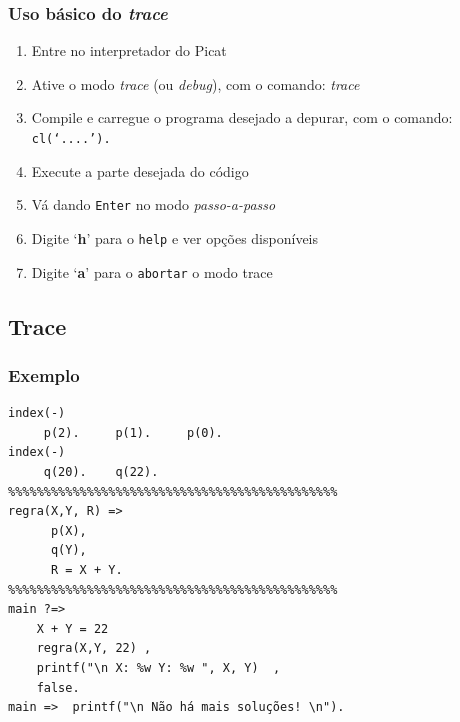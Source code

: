 \begin{frame}[fragile]

\frametitle{Uso básico do \textit{trace}}

\begin{enumerate}
  \item Entre no interpretador do Picat
  
    \item Ative o modo \textit{trace} (ou \textit{debug}), com o comando: \textit{trace}
    
    \item Compile e carregue o programa desejado 
    a depurar, com o comando: \texttt{cl(`....').}
    
    \item Execute a parte desejada do código
    
    \item Vá dando \texttt{Enter} no modo \textit{passo-a-passo}
    
    \item Digite `\textbf{h}' para o \texttt{help}\texttt{\texttt{}}  e ver opções disponíveis
    \item Digite `\textbf{a}' para o \texttt{abortar}\texttt{} o modo trace
      
\end{enumerate}

\end{frame}







\subsection{Trace}
\begin{frame}[fragile]

\frametitle{Exemplo}

\begin{footnotesize}
\begin{verbatim}
index(-)      
     p(2).     p(1).     p(0).
index(-)      
     q(20).    q(22).
%%%%%%%%%%%%%%%%%%%%%%%%%%%%%%%%%%%%%%%%%%%%%% 
regra(X,Y, R) =>   
      p(X),
      q(Y),
      R = X + Y.
%%%%%%%%%%%%%%%%%%%%%%%%%%%%%%%%%%%%%%%%%%%%%% 
main ?=> 
    X + Y = 22
    regra(X,Y, 22) , 
    printf("\n X: %w Y: %w ", X, Y)  ,  
    false.
main =>  printf("\n Não há mais soluções! \n"). 
\end{verbatim}
\end{footnotesize}
\end{frame}


